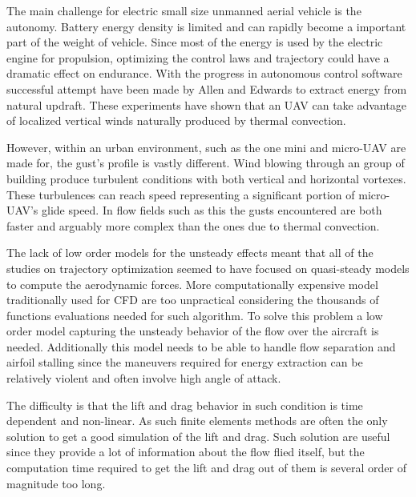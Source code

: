  \label{subsec:dynsoar}

The main challenge for electric small size unmanned aerial vehicle is the autonomy.
Battery energy density is limited and can rapidly become a important part of the weight of vehicle.
Since most of the energy is used by the electric engine for propulsion, optimizing the control laws and trajectory could have a dramatic effect on endurance. 
With the progress in autonomous control software successful attempt have been made by Allen \cite{flight_test_soaring_NASA} and Edwards \cite{flight_test_soaring_NCU} to extract energy from natural updraft.
These experiments have shown that an UAV can take advantage of localized vertical winds naturally produced by thermal convection.

\par However, within an urban environment, such as the one mini and micro-UAV are made for, the gust's profile is vastly different. 
Wind blowing through an group of building produce turbulent conditions with both vertical and horizontal vortexes.
These turbulences can reach speed representing a significant portion of micro-UAV's glide speed. 
In flow fields such as this the gusts encountered are both faster and arguably more complex than the ones due to thermal convection.

\par The lack of low order models for the unsteady effects meant that all of the studies on trajectory optimization seemed to have focused on quasi-steady models to compute the aerodynamic forces.
More computationally expensive model traditionally used for CFD are too unpractical considering the thousands of functions evaluations needed for such algorithm.
To solve this problem a low order model capturing the unsteady behavior of the flow over the aircraft is needed.
Additionally this model needs to be able to handle flow separation and airfoil stalling since the maneuvers required for energy extraction can be relatively violent and often involve high angle of attack.


The difficulty is that the lift and drag behavior in such condition is time dependent and non-linear.
As such finite elements methods are often the only solution to get a good simulation of the lift and drag.
Such solution are useful since they provide a lot of information about the flow flied itself, but the computation time required to get the lift and drag out of them is several order of magnitude too long.

